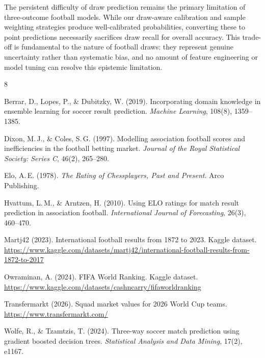 \documentclass[11pt,a4paper]{article}
\begin{document}
The persistent difficulty of draw prediction remains the primary limitation of three-outcome football models. While our draw-aware calibration and sample weighting strategies produce well-calibrated probabilities, converting these to point predictions necessarily sacrifices draw recall for overall accuracy. This trade-off is fundamental to the nature of football draws: they represent genuine uncertainty rather than systematic bias, and no amount of feature engineering or model tuning can resolve this epistemic limitation.


\begin{thebibliography}{8}

Berrar, D., Lopes, P., \& Dubitzky, W. (2019).
Incorporating domain knowledge in ensemble learning for soccer result prediction.
\textit{Machine Learning}, 108(8), 1359--1385.

Dixon, M.\,J., \& Coles, S.\,G. (1997).
Modelling association football scores and inefficiencies in the football betting market.
\textit{Journal of the Royal Statistical Society: Series C}, 46(2), 265--280.

Elo, A.\,E. (1978).
\textit{The Rating of Chessplayers, Past and Present}.
Arco Publishing.

Hvattum, L.\,M., \& Arntzen, H. (2010).
Using ELO ratings for match result prediction in association football.
\textit{International Journal of Forecasting}, 26(3), 460--470.

Martj42 (2023).
International football results from 1872 to 2023.
Kaggle dataset.
\url{https://www.kaggle.com/datasets/martj42/international-football-results-from-1872-to-2017}

Owraminan, A. (2024).
FIFA World Ranking. Kaggle dataset.
\url{https://www.kaggle.com/datasets/cashncarry/fifaworldranking}

Transfermarkt (2026).
Squad market values for 2026 World Cup teams.
\url{https://www.transfermarkt.com/}

Wolfe, R., \& Tzamtzis, T. (2024).
Three-way soccer match prediction using gradient boosted decision trees.
\textit{Statistical Analysis and Data Mining}, 17(2), e1167.

\end{thebibliography}

\appendix
\end{document}
